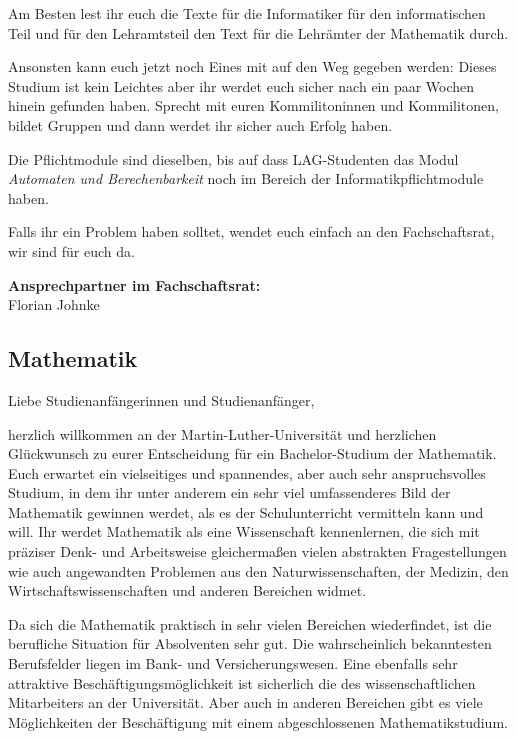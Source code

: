 Am Besten lest ihr euch die Texte für die Informatiker für den informatischen Teil und für den Lehramtsteil den Text für die Lehrämter der Mathematik durch.

Ansonsten kann euch jetzt noch Eines mit auf den Weg gegeben werden:
Dieses Studium ist kein Leichtes aber ihr werdet euch sicher nach ein paar Wochen hinein gefunden haben.
Sprecht mit euren Kommilitoninnen und Kommilitonen, bildet Gruppen und dann werdet ihr sicher auch Erfolg haben.

Die Pflichtmodule sind dieselben, bis auf dass LAG-Studenten das Modul \textit{Automaten und Berechenbarkeit} noch im Bereich der Informatikpflichtmodule haben.

Falls ihr ein Problem haben solltet, wendet euch einfach an den Fachschaftsrat, wir sind für euch da.

\textbf{Ansprechpartner im Fachschaftsrat:}\\
Florian Johnke\\

\newpage

\subsection{Mathematik}
\label{studiengang_mathematik}

Liebe Studienanfängerinnen und Studienanfänger,\par

herzlich willkommen an der Martin-Luther-Universität und herzlichen Glückwunsch zu eurer Entscheidung für ein Bachelor-Studium der Mathematik.
Euch erwartet ein vielseitiges und spannendes, aber auch sehr anspruchsvolles Studium, in dem ihr unter anderem ein sehr viel umfassenderes Bild der Mathematik gewinnen werdet, als es der Schulunterricht vermitteln kann und will.
Ihr werdet Mathematik als eine Wissenschaft kennenlernen, die sich mit präziser Denk- und Arbeitsweise gleichermaßen vielen abstrakten Fragestellungen wie auch angewandten Problemen aus den Naturwissenschaften, der Medizin, den Wirtschaftswissenschaften und anderen Bereichen widmet.

Da sich die Mathematik praktisch in sehr vielen Bereichen wiederfindet, ist die berufliche Situation für Absolventen sehr gut.
Die wahrscheinlich bekanntesten Berufsfelder liegen im Bank- und Versicherungswesen.
Eine ebenfalls sehr attraktive Beschäftigungsmöglichkeit ist sicherlich die des wissenschaftlichen Mitarbeiters an der Universität.
Aber auch in anderen Bereichen gibt es viele Möglichkeiten der Beschäftigung mit einem abgeschlossenen Mathematikstudium.

